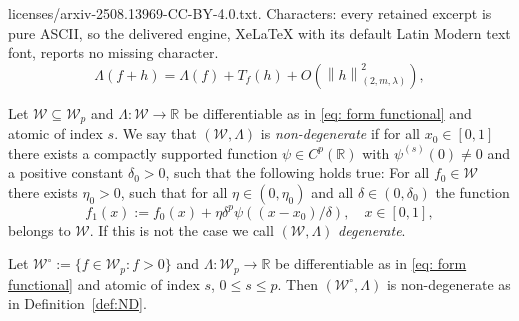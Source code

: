 \documentclass[10pt,a4paper]{amsart}
\newcommand\norm[1]{\left\lVert#1\right\rVert}
\newcommand{\R}{{\mathbb R}}
\begin{document}
licenses/arxiv-2508.13969-CC-BY-4.0.txt. Characters: every retained excerpt is pure ASCII, so the delivered engine, XeLaTeX with its default Latin Modern text font, reports no missing character.
\begin{equation}\label{eq: form functional}
    \Lambda(f+h) = \Lambda(f) + T_f(h) + O(\norm{h}^2_{(2,m,\lambda)}),
\end{equation}

\begin{definition}\label{def:ND}
    Let $\mathcal W\subseteq \mathcal W_p$ and $\Lambda:\mathcal W \to \mathbb R$ be differentiable as in \eqref{eq: form functional} and atomic of index $s$. We say that $(\mathcal W, \Lambda)$ is \emph{non-degenerate} if for all $x_0\in[0,1]$ there exists a compactly supported function $\psi\in C^p(\R)$ with $\psi^{(s)}(0)\neq 0$ and a positive constant $\delta_0>0$, such that the following holds true: For all $f_0\in\mathcal W$ there exists $\eta_0>0$, such that for all $\eta\in(0,\eta_0)$ and all $\delta\in(0,\delta_0)$ the function
    $$
    f_1(x) := f_0(x) + \eta\delta^p\psi((x-x_0)/\delta), \quad x\in[0,1],
    $$
    belongs to $\mathcal W$. If this is not the case we call $(\mathcal W,\Lambda)$ \emph{degenerate}.
\end{definition}

\begin{lemma}\label{lemma:W0}
    Let $\mathcal W^\circ := \{f\in\mathcal W_p : f>0\}$ and $\Lambda:\mathcal W_p \to \mathbb R$ be differentiable as in \eqref{eq: form functional} and atomic of index $s$, $0\le s\le p$. Then $(\mathcal W^\circ,\Lambda)$ is non-degenerate as in Definition~\ref{def:ND}.
\end{lemma}
\end{document}
